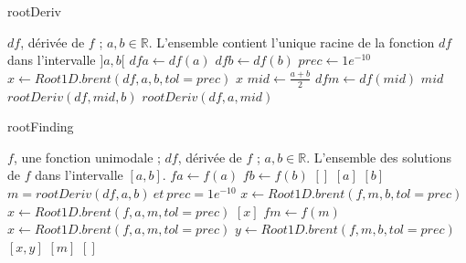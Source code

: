\documentclass[a4paper, 12pt]{article}
\begin{document}
\begin{algorithm}

\caption{rootDeriv}
\label{Modele pour un algo}

\begin{algorithmic}

\REQUIRE \( df \), dérivée de \( f \) ; \( a, b  \in \mathbb{R} \).
\ENSURE L'ensemble contient l'unique racine de la fonction \( df \) dans l'intervalle \( ]a, b[ \)
\STATE \( dfa \leftarrow df(a) \)
\STATE \( dfb \leftarrow df(b) \)
\STATE \( prec \leftarrow 1e^{-10} \)
	\STATE \( x \leftarrow Root1D.brent(df, a, b, tol=prec) \)
	\RETURN $x$
\ELSE
	\STATE \( mid \leftarrow \frac{a + b}{2} \)
	\STATE \( dfm \leftarrow df(mid) \)
		\RETURN $mid$
		\RETURN \( rootDeriv(df, mid, b) \)
	\ELSE
		\RETURN \( rootDeriv(df, a, mid) \)
	\ENDIF
\ENDIF

\end{algorithmic}

\end{algorithm}%
\begin{algorithm}

\caption{rootFinding}
\label{Modele pour un algo}

\begin{algorithmic}

\REQUIRE \( f \), une fonction unimodale ; \( df \), dérivée de \( f \) ; \( a, b  \in \mathbb{R} \).
\ENSURE L'ensemble des solutions de \( f \) dans l'intervalle \( [a, b] \).
\STATE \( fa \leftarrow f(a) \)
\STATE \( fb \leftarrow f(b) \)
	\RETURN  $[]$
	\RETURN $[a]$
	\RETURN $[b]$
\ELSE
	\STATE \( m = rootDeriv(df, a, b) ~ et ~ prec = 1e^{-10}\)
		\STATE \( x \leftarrow Root1D.brent(f, m, b, tol=prec) \)
		\STATE \( x \leftarrow Root1D.brent(f, a, m, tol=prec) \)
		\RETURN $[x]$
	\ELSE
		\STATE \( fm \leftarrow f(m) \)
			\STATE \( x \leftarrow Root1D.brent(f, a, m, tol=prec) \)
			\STATE \( y \leftarrow Root1D.brent(f, m, b, tol=prec) \)
			\RETURN $[x, y]$
			\RETURN $[m]$
		\ELSE
			\RETURN $[]$
		\ENDIF
	\ENDIF
\ENDIF

\end{algorithmic}

\end{algorithm}
\end{document}
